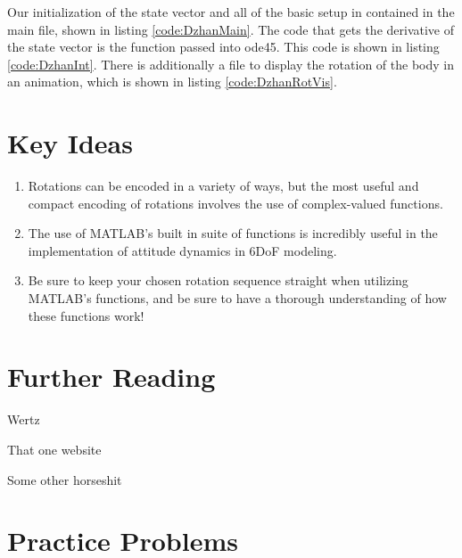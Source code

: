 \documentclass[12pt]{report}
\begin{document}
Our initialization of the \gls{state vector} and all of the basic setup in contained in the main file, shown in listing \ref{code:DzhanMain}. The code that gets the derivative of the \gls{state vector} is the function passed into ode45. This code is shown in listing \ref{code:DzhanInt}. There is additionally a file to display the rotation of the body in an animation, which is shown in listing \ref{code:DzhanRotVis}.

\section{Key Ideas}
\begin{enumerate}
    \item Rotations can be encoded in a variety of ways, but the most useful and compact encoding of rotations involves the use of complex-valued functions.
    \item The use of MATLAB's built in suite of functions is incredibly useful in the implementation of attitude dynamics in 6DoF modeling.
    \item Be sure to keep your chosen rotation sequence straight when utilizing MATLAB's functions, and be sure to have a thorough understanding of how these functions work!
\end{enumerate}
\section{Further Reading}

Wertz

That one website

Some other horseshit

\section{Practice Problems}
\end{document}
